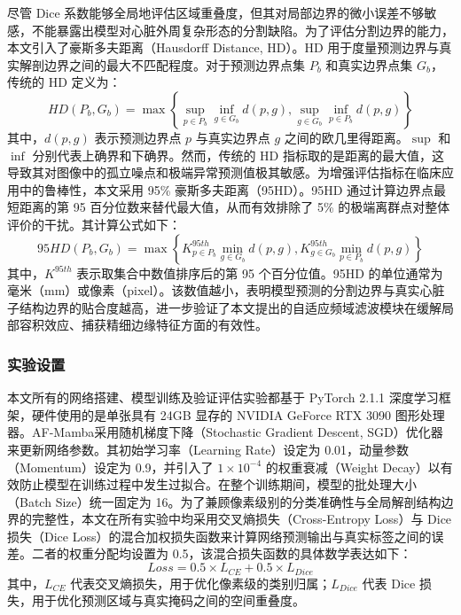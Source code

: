 \documentclass[12pt, a4paper, twoside]{article}
\begin{document}
尽管 Dice 系数能够全局地评估区域重叠度，但其对局部边界的微小误差不够敏感，不能暴露出模型对心脏外周复杂形态的分割缺陷。为了评估分割边界的能力，本文引入了豪斯多夫距离（Hausdorff Distance, HD）。HD 用于度量预测边界与真实解剖边界之间的最大不匹配程度。对于预测边界点集 $P_b$ 和真实边界点集 $G_b$，传统的 HD 定义为：
\begin{equation}
HD(P_b, G_b) = \max \left\{ \sup_{p \in P_b} \inf_{g \in G_b} d(p, g), \sup_{g \in G_b} \inf_{p \in P_b} d(p, g) \right\}
\end{equation}
其中，$d(p, g)$ 表示预测边界点 $p$ 与真实边界点 $g$ 之间的欧几里得距离。$\sup$ 和 $\inf$ 分别代表上确界和下确界。然而，传统的 HD 指标取的是距离的最大值，这导致其对图像中的孤立噪点和极端异常预测值极其敏感。为增强评估指标在临床应用中的鲁棒性，本文采用 95\% 豪斯多夫距离（95HD）。95HD 通过计算边界点最短距离的第 95 百分位数来替代最大值，从而有效排除了 5\% 的极端离群点对整体评价的干扰。其计算公式如下：
\begin{equation}
95HD(P_b, G_b) = \max \left\{ K_{p \in P_b}^{95th} \min_{g \in G_b} d(p, g), K_{g \in G_b}^{95th} \min_{p \in P_b} d(p, g) \right\}
\end{equation}
其中，$K^{95th}$ 表示取集合中数值排序后的第 95 个百分位值。95HD 的单位通常为毫米（mm）或像素（pixel）。该数值越小，表明模型预测的分割边界与真实心脏子结构边界的贴合度越高，进一步验证了本文提出的自适应频域滤波模块在缓解局部容积效应、捕获精细边缘特征方面的有效性。

\subsubsection{实验设置}

本文所有的网络搭建、模型训练及验证评估实验都基于 PyTorch 2.1.1 深度学习框架，硬件使用的是单张具有 24GB 显存的 NVIDIA GeForce RTX 3090 图形处理器。AF-Mamba采用随机梯度下降（Stochastic Gradient Descent, SGD）优化器来更新网络参数。其初始学习率（Learning Rate）设定为 0.01，动量参数（Momentum）设定为 0.9，并引入了 $1 \times 10^{-4}$ 的权重衰减（Weight Decay）以有效防止模型在训练过程中发生过拟合。在整个训练期间，模型的批处理大小（Batch Size）统一固定为 16。为了兼顾像素级别的分类准确性与全局解剖结构边界的完整性，本文在所有实验中均采用交叉熵损失（Cross-Entropy Loss）与 Dice 损失（Dice Loss）的混合加权损失函数来计算网络预测输出与真实标签之间的误差。二者的权重分配均设置为 0.5，该混合损失函数的具体数学表达如下：
\begin{equation}
Loss = 0.5 \times L_{CE} + 0.5 \times L_{Dice}
\end{equation}
其中，$L_{CE}$ 代表交叉熵损失，用于优化像素级的类别归属；$L_{Dice}$ 代表 Dice 损失，用于优化预测区域与真实掩码之间的空间重叠度。
\end{document}

